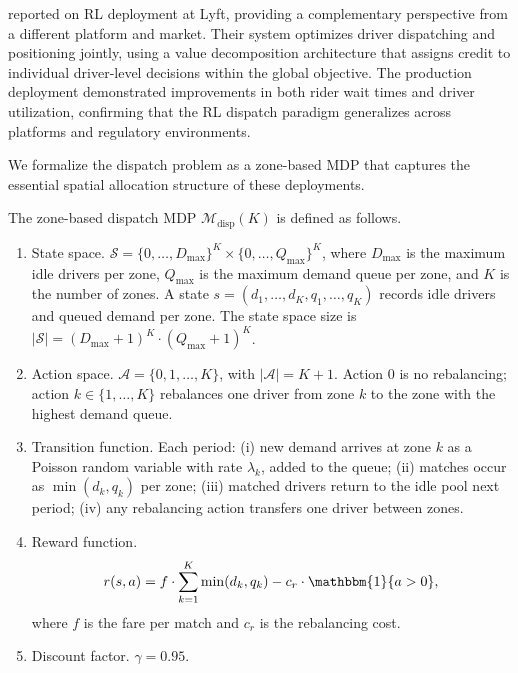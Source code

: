 \citet{Han2022lyft} reported on RL deployment at Lyft, providing a complementary perspective from a different platform and market. Their system optimizes driver dispatching and positioning jointly, using a value decomposition architecture that assigns credit to individual driver-level decisions within the global objective. The production deployment demonstrated improvements in both rider wait times and driver utilization, confirming that the RL dispatch paradigm generalizes across platforms and regulatory environments.

We formalize the dispatch problem as a zone-based MDP that captures the essential spatial allocation structure of these deployments.

\begin{definition}
\label{def:dispatch_mdp}
The zone-based dispatch MDP $\mathcal{M}_{\mathrm{disp}}(K)$ is defined as follows.
\begin{enumerate}
    \item State space. $\mathcal{S} = \{0, \ldots, D_{\max}\}^K \times \{0, \ldots, Q_{\max}\}^K$, where $D_{\max}$ is the maximum idle drivers per zone, $Q_{\max}$ is the maximum demand queue per zone, and $K$ is the number of zones. A state $s = (d_1, \ldots, d_K, q_1, \ldots, q_K)$ records idle drivers and queued demand per zone. The state space size is $|\mathcal{S}| = (D_{\max}+1)^K \cdot (Q_{\max}+1)^K$.
    \item Action space. $\mathcal{A} = \{0, 1, \ldots, K\}$, with $|\mathcal{A}| = K + 1$. Action $0$ is no rebalancing; action $k \in \{1, \ldots, K\}$ rebalances one driver from zone $k$ to the zone with the highest demand queue.
    \item Transition function. Each period: (i) new demand arrives at zone $k$ as a Poisson random variable with rate $\lambda_k$, added to the queue; (ii) matches occur as $\min(d_k, q_k)$ per zone; (iii) matched drivers return to the idle pool next period; (iv) any rebalancing action transfers one driver between zones.
    \item Reward function.
    \begin{equation}
    \label{eq:dispatch_reward}
    r(s, a) = f \cdot \sum_{k=1}^{K} \min(d_k, q_k) - c_r \cdot \mathbbm{1}\{a > 0\},
    \end{equation}
    where $f$ is the fare per match and $c_r$ is the rebalancing cost.
    \item Discount factor. $\gamma = 0.95$.
\end{enumerate}
\end{definition}

